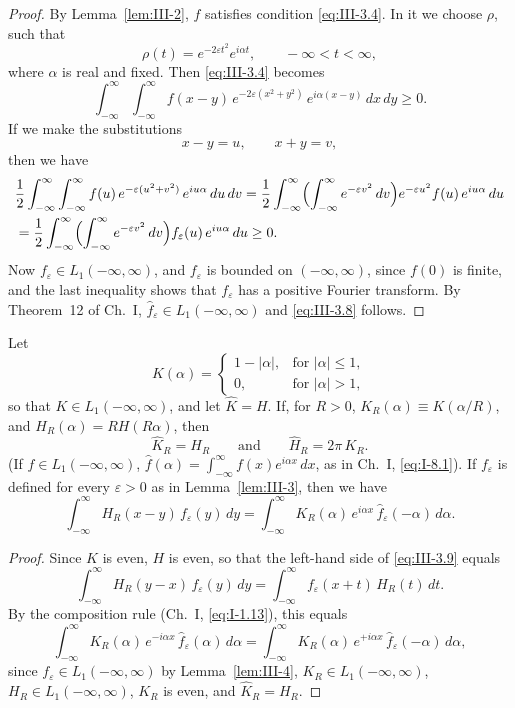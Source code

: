 \begin{proof}
By Lemma~\ref{lem:III-2}, $f$ satisfies condition \eqref{eq:III-3.4}. In it we choose $\rho$, such that
\[
\rho(t)=e^{-2\varepsilon t^{2}}e^{i\alpha t},\qquad-\infty<t<\infty,
\]
where $\alpha$ is real and fixed. Then \eqref{eq:III-3.4} becomes
\[
\int_{-\infty}^{\infty}\int_{-\infty}^{\infty}f(x-y)\,e^{-2\varepsilon(x^{2}+y^{2})}\,e^{i\alpha(x-y)}\,dx\,dy\ge0.
\]
If we make the substitutions
\[
x-y=u,\qquad x+y=v,
\]
then we have
\begin{align*}
&\frac12\int_{-\infty}^{\infty}\int_{-\infty}^{\infty}f(u)\,e^{-\varepsilon(u^{2}+v^{2})}\,e^{iu\alpha}\,du\,dv
=\frac12\int_{-\infty}^{\infty}\Bigl(\int_{-\infty}^{\infty}e^{-\varepsilon v^{2}}\,dv\Bigr)e^{-\varepsilon u^{2}}f(u)\,e^{iu\alpha}\,du\\
&=\frac12\int_{-\infty}^{\infty}\Bigl(\int_{-\infty}^{\infty}e^{-\varepsilon v^{2}}\,dv\Bigr)f_{\varepsilon}(u)\,e^{iu\alpha}\,du\ge0.
\end{align*}
Now $f_{\varepsilon}\in L_{1}(-\infty,\infty)$, and $f_{\varepsilon}$ is bounded on $(-\infty,\infty)$, since $f(0)$ is finite, and the last inequality shows that $f_{\varepsilon}$ has a positive Fourier transform. By Theorem~12 of Ch.~I, $\hat f_{\varepsilon}\in L_{1}(-\infty,\infty)$ and \eqref{eq:III-3.8} follows.
\end{proof}

\begin{lemma}\label{lem:III-5}
Let
\[
K(\alpha)=
\begin{cases}
1-|\alpha|,&\text{for }|\alpha|\le1,\\
0,&\text{for }|\alpha|>1,
\end{cases}
\]
so that $K\in L_{1}(-\infty,\infty)$, and let $\hat K=H$. If, for $R>0$, $K_{R}(\alpha)\equiv K(\alpha/R)$, and $H_{R}(\alpha)=RH(R\alpha)$, then
\[
\hat K_{R}=H_{R}\qquad\text{and}\qquad\hat H_{R}=2\pi\,K_{R}.
\]
(If $f\in L_{1}(-\infty,\infty)$, $\hat f(\alpha)=\int_{-\infty}^{\infty}f(x)e^{i\alpha x}\,dx$, as in Ch.~I, \eqref{eq:I-8.1}). If $f_{\varepsilon}$ is defined for every $\varepsilon>0$ as in Lemma~\ref{lem:III-3}, then we have
\begin{equation}\tag{3.9}\label{eq:III-3.9}
\int_{-\infty}^{\infty}H_{R}(x-y)\,f_{\varepsilon}(y)\,dy
=\int_{-\infty}^{\infty}K_{R}(\alpha)\,e^{i\alpha x}\,\hat f_{\varepsilon}(-\alpha)\,d\alpha.
\end{equation}
\end{lemma}

\begin{proof}
Since $K$ is even, $H$ is even, so that the left-hand side of \eqref{eq:III-3.9} equals
\[
\int_{-\infty}^{\infty}H_{R}(y-x)\,f_{\varepsilon}(y)\,dy
=\int_{-\infty}^{\infty}f_{\varepsilon}(x+t)\,H_{R}(t)\,dt.
\]
By the composition rule (Ch.~I, \eqref{eq:I-1.13}), this equals
\[
\int_{-\infty}^{\infty}K_{R}(\alpha)\,e^{-i\alpha x}\,\hat f_{\varepsilon}(\alpha)\,d\alpha
=\int_{-\infty}^{\infty}K_{R}(\alpha)\,e^{+i\alpha x}\,\hat f_{\varepsilon}(-\alpha)\,d\alpha,
\]
since $f_{\varepsilon}\in L_{1}(-\infty,\infty)$ by Lemma~\ref{lem:III-4}, $K_{R}\in L_{1}(-\infty,\infty)$, $H_{R}\in L_{1}(-\infty,\infty)$, $K_{R}$ is even, and $\hat K_{R}=H_{R}$.
\end{proof}

